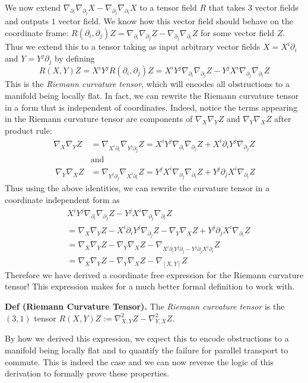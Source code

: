 \documentclass[
]{article}
\begin{document}
We now extend
\(\nabla_{\partial_{i}}\nabla_{\partial_{j}} X - \nabla_{\partial_{j}}\nabla_{\partial_{i}} X\)
to a tensor field \(R\) that takes \(3\) vector fields and outputs \(1\)
vector field. We know how this vector field should behave on the
coordinate frame:
\(R(\partial_{i}, \partial_{j})Z = \nabla_{\partial_{i}}\nabla_{\partial_{j}} Z - \nabla_{\partial_{j}}\nabla_{\partial_{i}} Z\)
for some vector field \(Z\). Thus we extend this to a tensor taking as
input arbitrary vector fields \(X = X^i\partial_i\) and
\(Y = Y^j\partial_j\) by defining \[
    R(X, Y)Z = X^iY^jR(\partial_i, \partial_j)Z 
    = X^iY^j\nabla_{\partial_{i}}\nabla_{\partial_{j}} Z - Y^jX^i\nabla_{\partial_{j}}\nabla_{\partial_{i}} Z
\] This is the \emph{Riemann curvature tensor}, which will encodes all
obstructions to a manifold being locally flat. In fact, we can rewrite
the Riemann curvature tensor in a form that is independent of
coordinates. Indeed, notice the terms appearing in the Riemann curvature
tensor are components of \(\nabla_X\nabla_Y Z\) and
\(\nabla_Y\nabla_X Z\) after product rule: \begin{align}
    \nabla_X\nabla_Y Z 
    &= \nabla_{X^i\partial_i}\nabla_{Y^j\partial_j} Z 
    = X^iY^j\nabla_{\partial_i}\nabla_{\partial_j} Z + X^i\partial_iY^j\nabla_{\partial_j}Z\\\
    &\text{and}\\\
    \nabla_Y\nabla_X Z 
    &= \nabla_{Y^j\partial_j}\nabla_{X^i\partial_i} Z 
    = Y^jX^i\nabla_{\partial_j}\nabla_{\partial_i} Z + Y^j\partial_jX^i\nabla_{\partial_i}Z
\end{align} Thus using the above identities, we can rewrite the
curvature tensor in a coordinate independent form as \begin{align}
        & X^iY^j\nabla_{\partial_{i}}\nabla_{\partial_{j}} Z - Y^jX^i\nabla_{\partial_{j}}\nabla_{\partial_{i}} Z\\\
        &= \nabla_X\nabla_Y Z - X^i\partial_iY^j\nabla_{\partial_j}Z 
        - \nabla_Y\nabla_X Z 
        + Y^j\partial_jX^i\nabla_{\partial_i}Z\\\
        &=  \nabla_X\nabla_Y Z - \nabla_Y\nabla_X Z - \nabla_{X^i\partial_iY^j \partial_j - Y^j\partial_jX^i \partial_i}Z\\\
        &= \nabla_X\nabla_Y Z - \nabla_Y\nabla_X Z - \nabla_{[X,Y]}Z
    \end{align} Therefore we have derived a coordinate free expression
for the Riemann curvature tensor! This expression makes for a much
better formal definition to work with.

\textbf{Def (Riemann Curvature Tensor).} The \emph{Riemann curvature
tensor} is the \((3,1)\) tensor
\(R(X,Y)Z := \nabla^2_{X,Y} Z - \nabla^2_{Y,X} Z\).

By how we derived this expression, we expect this to encode obstructions
to a manifold being locally flat and to quantify the failure for
parallel transport to commute. This is indeed the case and we can now
reverse the logic of this derivation to formally prove these properties.
\end{document}
